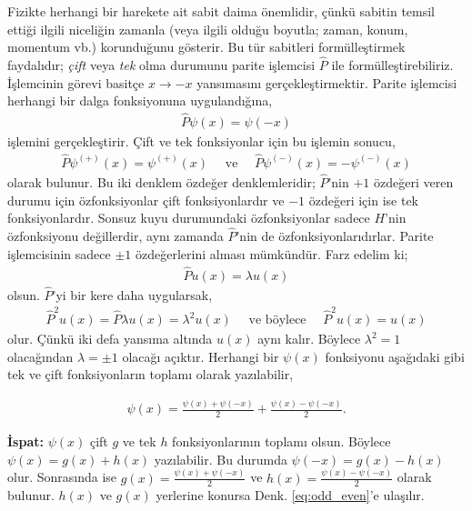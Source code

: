\documentclass[a4paper,12pt, twoside]{article}
\begin{document}
Fizikte herhangi bir harekete ait sabit daima önemlidir, çünkü sabitin temsil ettiği ilgili niceliğin zamanla (veya ilgili olduğu boyutla; zaman, konum, momentum vb.) korunduğunu gösterir. Bu tür sabitleri formülleştirmek faydalıdır; \emph{çift} veya \emph{tek} olma durumunu parite işlemcisi $\hat P$ ile formülleştirebiliriz. İşlemcinin görevi basitçe $x\rightarrow -x$ yansımasını gerçekleştirmektir. Parite işlemcisi herhangi bir dalga fonksiyonuna uygulandığına,
\begin{align}
\hat P \psi(x)=\psi(-x)
\end{align}
işlemini gerçekleştirir. Çift ve tek fonksiyonlar için bu işlemin sonucu,
\begin{align}
\hat P \psi^{(+)}(x)=\psi^{(+)}(x)
\quad \text{ ve } \quad \hat P \psi^{(-)}(x)=-\psi^{(-)}(x)
\end{align}
olarak bulunur. Bu iki denklem özdeğer denklemleridir; $\hat P$'nin $+1$ özdeğeri veren durumu için özfonksiyonlar çift fonksiyonlardır ve $-1$ özdeğeri için ise tek fonksiyonlardır. Sonsuz kuyu durumundaki özfonksiyonlar sadece $H$'nin özfonksiyonu değillerdir, aynı zamanda $\hat P$'nin de özfonksiyonlarıdırlar. Parite işlemcisinin sadece $\pm 1$ özdeğerlerini alması mümkündür. Farz edelim ki;
\begin{align}
\hat P u(x)=\lambda u(x)
\end{align}
olsun. $\hat P$'yi bir kere daha uygularsak,
\begin{align}
\hat P^2 u(x)=\hat P \lambda u(x)
= \lambda^2 u(x) \quad \text{ ve böylece }  \quad  \hat P^2 u(x)= u(x) 
\end{align}
olur. Çünkü  iki defa yansıma altında $u(x)$ aynı kalır. Böylece $\lambda^2 = 1$ olacağından $\lambda = \pm 1$ olacağı açıktır. Herhangi bir $\psi(x)$ fonksiyonu aşağıdaki gibi tek ve çift fonksiyonların toplamı olarak yazılabilir,

\begin{align}
\label{eq:odd_even}
\psi(x) = \frac {\psi(x) + \psi(-x)}2  + \frac {\psi(x) - \psi(-x)}2.
\end{align}

\begin{tcolorbox}
{\bf İspat:} $\psi(x)$ çift  $g$ ve tek $h$ fonksiyonlarının toplamı olsun. Böylece $\psi(x) = g(x) + h(x)$ yazılabilir. Bu durumda $\psi(-x) = g(x) - h(x)$ olur. Sonrasında ise $g(x) = \frac {\psi(x) + \psi(-x)}2$ ve $h(x) = \frac {\psi(x) - \psi(-x)}2$ olarak bulunur. $h(x)$ ve $g(x)$ yerlerine konursa Denk. \ref{eq:odd_even}'e ulaşılır.
\end{tcolorbox}
\end{document}
